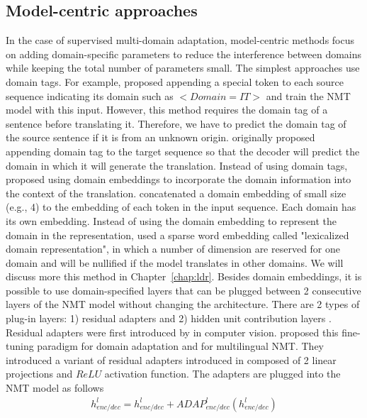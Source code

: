 \subsection{Model-centric approaches}
In the case of supervised multi-domain adaptation, model-centric methods focus on adding domain-specific parameters to reduce the interference between domains while keeping the total number of parameters small. The simplest approaches use domain tags. For example, \citet{Kobus17domain} proposed appending a special token to each source sequence indicating its domain such as $<Domain=IT>$ and train the NMT model with this input. However, this method requires the domain tag of a sentence before translating it. Therefore, we have to predict the domain tag of the source sentence if it is from an unknown origin. \citet{Britz17effective} originally proposed appending domain tag to the target sequence so that the decoder will predict the domain in which it will generate the translation. Instead of using domain tags, \citep{Kobus17domain} proposed using domain embeddings to incorporate the domain information into the context of the translation. \citet{Kobus17domain} concatenated a domain embedding of small size (e.g., 4) to the embedding of each token in the input sequence. Each domain has its own embedding. Instead of using the domain embedding to represent the domain in the representation, \citet{Pham19generic} used a sparse word embedding called "lexicalized domain representation", in which a number of dimension are reserved for one domain and will be nullified if the model translates in other domains. We will discuss more this method in Chapter~\ref{chap:ldr}. Besides domain embeddings, it is possible to use domain-specified layers that can be plugged between 2 consecutive layers of the NMT model without changing the architecture. There are 2 types of plug-in layers: 1) residual adapters \citep{Bapna19simple, Pham20Study} and 2) hidden unit contribution layers \citep{Vilar18learning}. Residual adapters were first introduced by \citet{Rebuffi17learning} in computer vision. \citet{Bapna19simple} proposed this fine-tuning paradigm for domain adaptation and for multilingual NMT. They introduced a variant of residual adapters introduced in \citet{Rebuffi17learning} composed of 2 linear projections and $ReLU$ activation function. The adapters are plugged into the NMT model as follows
\begin{equation}
\begin{array}{rcl}
h_{enc/dec}^l = h_{enc/dec}^{l} + ADAP_{enc/dec}^l(h_{enc/dec}^{l})
\end{array}
\end{equation}
